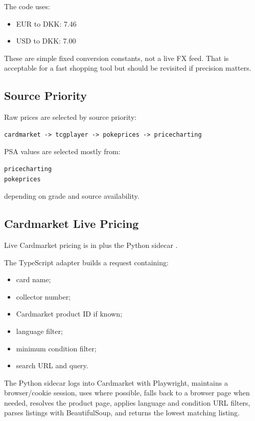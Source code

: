 \documentclass[11pt,a4paper]{article}
\begin{document}
The code uses:

\begin{itemize}
  \item EUR to DKK: 7.46
  \item USD to DKK: 7.00
\end{itemize}

These are simple fixed conversion constants, not a live FX feed. That is acceptable for a fast shopping tool but should be revisited if precision matters.

\subsection{Source Priority}

Raw prices are selected by source priority:

\begin{lstlisting}
cardmarket -> tcgplayer -> pokeprices -> pricecharting
\end{lstlisting}

PSA values are selected mostly from:

\begin{lstlisting}
pricecharting
pokeprices
\end{lstlisting}

depending on grade and source availability.

\subsection{Cardmarket Live Pricing}

Live Cardmarket pricing is in  plus the Python sidecar .

The TypeScript adapter builds a request containing:

\begin{itemize}
  \item card name;
  \item collector number;
  \item Cardmarket product ID if known;
  \item language filter;
  \item minimum condition filter;
  \item search URL and query.
\end{itemize}

The Python sidecar logs into Cardmarket with Playwright, maintains a browser/cookie session, uses  where possible, falls back to a browser page when needed, resolves the product page, applies language and condition URL filters, parses listings with BeautifulSoup, and returns the lowest matching listing.
\end{document}
